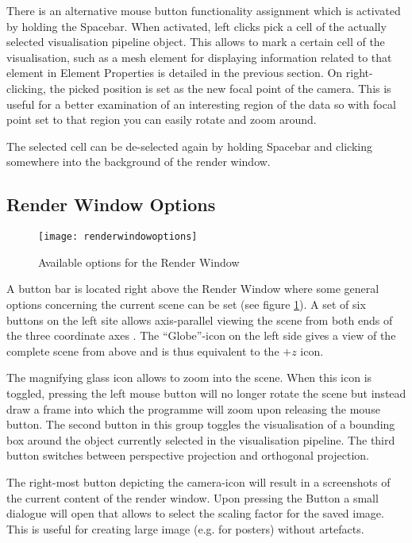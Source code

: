 There is an alternative mouse button functionality assignment which is activated by holding the Spacebar. When activated, left clicks pick a cell of the actually selected visualisation pipeline object. This allows to mark a certain cell of the visualisation, such as a mesh element for displaying information related to that element in Element Properties is detailed in the previous section. On right-clicking, the picked position is set as the new focal point of the camera. This is useful for a better examination of an interesting region of the data so with focal point set to that region you can easily rotate and zoom around.

The selected cell can be de-selected again by holding Spacebar and clicking somewhere into the background of the render window.

\subsection{Render Window Options}

\begin{figure}[tb]
\begin{center}
\texttt{[image: renderwindowoptions]}
\caption{Available options for the Render Window}
\label{fig:renderoptions}
\end{center}
\end{figure}

A button bar is located right above the Render Window where some general options concerning the current scene can be set (see figure \ref{fig:renderoptions}). A set of six buttons on the left site allows axis-parallel viewing the scene from both ends of the three coordinate axes . The ``Globe''-icon on the left side gives a view of the complete scene from above and is thus equivalent to the $+z$ icon.

The magnifying glass icon allows to zoom into the scene. When this icon is toggled, pressing the left mouse button will no longer rotate the scene but instead draw a frame into which the programme will zoom upon releasing the mouse button. The second button in this group toggles the visualisation of a bounding box around the object currently selected in the visualisation pipeline. The third button switches between perspective projection and orthogonal projection.

The right-most button depicting the camera-icon will result in a screenshots of the current content of the render window. Upon pressing the Button a small dialogue will open that allows to select the scaling factor for the saved image. This is useful for creating large image (e.g. for posters) without artefacts.

